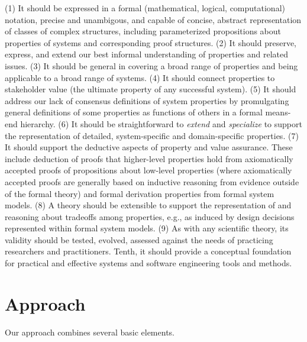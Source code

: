\documentclass[conference]{IEEEtran}
\begin{document}
(1) It should be expressed in a formal (mathematical, logical, computational) notation, precise and unambigous, and capable of concise, abstract representation of classes of complex structures, including parameterized propositions about properties of systems and corresponding proof structures. (2) It should preserve, express, and extend our best informal understanding of properties and related issues. (3) It should be general in covering a broad range of properties and being applicable to a broad range of systems. (4) It should connect properties to stakeholder value (the ultimate property of any successful system). (5) It should address our lack of consensus definitions of system properties by promulgating general definitions of some properties as functions of others in a formal means-end hierarchy. (6) It should be straightforward to {\em extend} and {\em specialize} to support the representation of detailed, system-specific and domain-specific properties. (7) It should support the deductive aspects of property and value assurance. These include deduction of proofs that higher-level properties hold from axiomatically accepted proofs of propositions about low-level properties (where axiomatically accepted proofs are generally based on inductive reasoning from evidence outside of the formal theory) and formal derivation properties from formal system models. (8) A theory should be extensible to support the representation of and reasoning about tradeoffs among properties, e.g., as induced by design decisions represented within formal system models. (9) As with any scientific theory, its validity should be tested, evolved, assessed against the needs of practicing researchers and practitioners. Tenth, it should provide a conceptual foundation for practical and effective systems and software engineering tools and methods.

\section{Approach} 

Our approach  combines several basic elements.  
\end{document}
